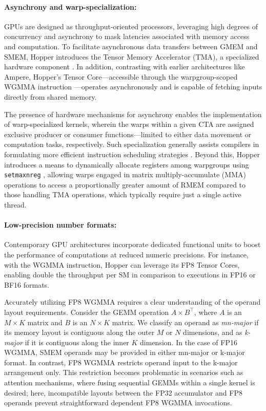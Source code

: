 \paragraph{Asynchrony and warp-specialization:}

GPUs are designed as throughput-oriented processors, leveraging high degrees of concurrency and asynchrony to mask latencies associated with memory access and computation. To facilitate asynchronous data transfers between GMEM and SMEM, Hopper introduces the Tensor Memory Accelerator (TMA), a specialized hardware component \cite[\S7.29]{cuda}. In addition, contrasting with earlier architectures like Ampere, Hopper's Tensor Core—accessible through the warpgroup-scoped WGMMA instruction \cite[\S9.7.14]{ptx}—operates asynchronously and is capable of fetching inputs directly from shared memory.

The presence of hardware mechanisms for asynchrony enables the implementation of warp-specialized kernels, wherein the warps within a given CTA are assigned exclusive producer or consumer functions—limited to either data movement or computation tasks, respectively. Such specialization generally assists compilers in formulating more efficient instruction scheduling strategies \citep{warp-specialization-2011}. Beyond this, Hopper introduces a means to dynamically allocate registers among warpgroups using \verb|setmaxnreg| \cite[\S9.7.17.1]{ptx}, allowing warps engaged in matrix multiply-accumulate (MMA) operations to access a proportionally greater amount of RMEM compared to those handling TMA operations, which typically require just a single active thread.

\paragraph{Low-precision number formats:}
\label{sec:low-precision-gpu}
Contemporary GPU architectures incorporate dedicated functional units to boost the performance of computations at reduced numeric precisions. For instance, with the WGMMA instruction, Hopper can leverage its FP8 Tensor Cores, enabling double the throughput per SM in comparison to executions in FP16 or BF16 formats.

Accurately utilizing FP8 WGMMA requires a clear understanding of the operand layout requirements. Consider the GEMM operation $A \times B^{\top}$, where $A$ is an $M\times K$ matrix and $B$ is an $N\times K$ matrix. We classify an operand as \emph{mn-major} if its memory layout is contiguous along the outer $M$ or $N$ dimensions, and as \emph{k-major} if it is contiguous along the inner $K$ dimension. In the case of FP16 WGMMA, SMEM operands may be provided in either mn-major or k-major format. In contrast, FP8 WGMMA restricts operand input to the k-major arrangement only. This restriction becomes problematic in scenarios such as attention mechanisms, where fusing sequential GEMMs within a single kernel is desired; here, incompatible layouts between the FP32 accumulator and FP8 operands prevent straightforward dependent FP8 WGMMA invocations.

